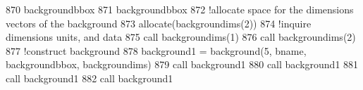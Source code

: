 \begin{DoxyCode}
870     backgroundbbox%
871     backgroundbbox%
872     \textcolor{comment}{!allocate space for the dimensions vectors of the background}
873     \textcolor{keyword}{allocate}(backgroundims(2))
874     \textcolor{comment}{!inquire dimensions units, and data}
875     \textcolor{keyword}{call }backgroundims(1)%
876     \textcolor{keyword}{call }backgroundims(2)%
877     \textcolor{comment}{!construct background}
878     background1 = background(5, bname, backgroundbbox, backgroundims)
879     \textcolor{keyword}{call }background1%
880     \textcolor{keyword}{call }background1%
881     \textcolor{keyword}{call }background1%
882     \textcolor{keyword}{call }background1%
\end{DoxyCode}
